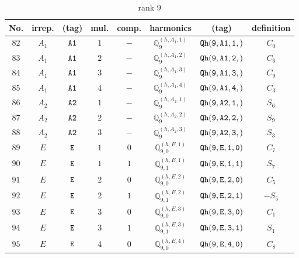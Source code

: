 \documentclass[fleqn,8pt]{jsarticle}
\begin{document}
\begin{table}[ht!]
\begin{center}
\caption{rank 9}
\renewcommand{\arraystretch}{1.3}
\begin{tabular}{cccccccc} \hline \hline
No. & irrep. & (tag) & mul. & comp. & harmonics & (tag) & definition \\ \hline
$ 82 $ & $ A_{1} $ & $ {\tt A1} $ & $ 1 $ & $ - $ & $ \mathbb{Q}_{9}^{(h,A_{1},1)} $ & $ {\tt Qh(9,A1,1,)} $ & $ C_{0} $ \\
$ 83 $ & $ A_{1} $ & $ {\tt A1} $ & $ 2 $ & $ - $ & $ \mathbb{Q}_{9}^{(h,A_{1},2)} $ & $ {\tt Qh(9,A1,2,)} $ & $ C_{6} $ \\
$ 84 $ & $ A_{1} $ & $ {\tt A1} $ & $ 3 $ & $ - $ & $ \mathbb{Q}_{9}^{(h,A_{1},3)} $ & $ {\tt Qh(9,A1,3,)} $ & $ C_{9} $ \\
$ 85 $ & $ A_{1} $ & $ {\tt A1} $ & $ 4 $ & $ - $ & $ \mathbb{Q}_{9}^{(h,A_{1},4)} $ & $ {\tt Qh(9,A1,4,)} $ & $ C_{3} $ \\
$ 86 $ & $ A_{2} $ & $ {\tt A2} $ & $ 1 $ & $ - $ & $ \mathbb{Q}_{9}^{(h,A_{2},1)} $ & $ {\tt Qh(9,A2,1,)} $ & $ S_{6} $ \\
$ 87 $ & $ A_{2} $ & $ {\tt A2} $ & $ 2 $ & $ - $ & $ \mathbb{Q}_{9}^{(h,A_{2},2)} $ & $ {\tt Qh(9,A2,2,)} $ & $ S_{9} $ \\
$ 88 $ & $ A_{2} $ & $ {\tt A2} $ & $ 3 $ & $ - $ & $ \mathbb{Q}_{9}^{(h,A_{2},3)} $ & $ {\tt Qh(9,A2,3,)} $ & $ S_{3} $ \\
$ 89 $ & $ E $ & $ {\tt E} $ & $ 1 $ & $ 0 $ & $ \mathbb{Q}_{9,0}^{(h,E,1)} $ & $ {\tt Qh(9,E,1,0)} $ & $ C_{7} $ \\
$ 90 $ & $ E $ & $ {\tt E} $ & $ 1 $ & $ 1 $ & $ \mathbb{Q}_{9,1}^{(h,E,1)} $ & $ {\tt Qh(9,E,1,1)} $ & $ S_{7} $ \\
$ 91 $ & $ E $ & $ {\tt E} $ & $ 2 $ & $ 0 $ & $ \mathbb{Q}_{9,0}^{(h,E,2)} $ & $ {\tt Qh(9,E,2,0)} $ & $ C_{5} $ \\
$ 92 $ & $ E $ & $ {\tt E} $ & $ 2 $ & $ 1 $ & $ \mathbb{Q}_{9,1}^{(h,E,2)} $ & $ {\tt Qh(9,E,2,1)} $ & $ - S_{5} $ \\
$ 93 $ & $ E $ & $ {\tt E} $ & $ 3 $ & $ 0 $ & $ \mathbb{Q}_{9,0}^{(h,E,3)} $ & $ {\tt Qh(9,E,3,0)} $ & $ C_{1} $ \\
$ 94 $ & $ E $ & $ {\tt E} $ & $ 3 $ & $ 1 $ & $ \mathbb{Q}_{9,1}^{(h,E,3)} $ & $ {\tt Qh(9,E,3,1)} $ & $ S_{1} $ \\
$ 95 $ & $ E $ & $ {\tt E} $ & $ 4 $ & $ 0 $ & $ \mathbb{Q}_{9,0}^{(h,E,4)} $ & $ {\tt Qh(9,E,4,0)} $ & $ C_{8} $ \\

\end{tabular}
\end{center}
\end{table}
\end{document}
